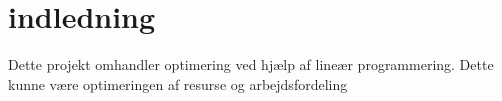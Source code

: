 \chapter{indledning}
Dette projekt omhandler optimering ved hjælp af lineær programmering. Dette kunne være optimeringen af resurse  og arbejdsfordeling

